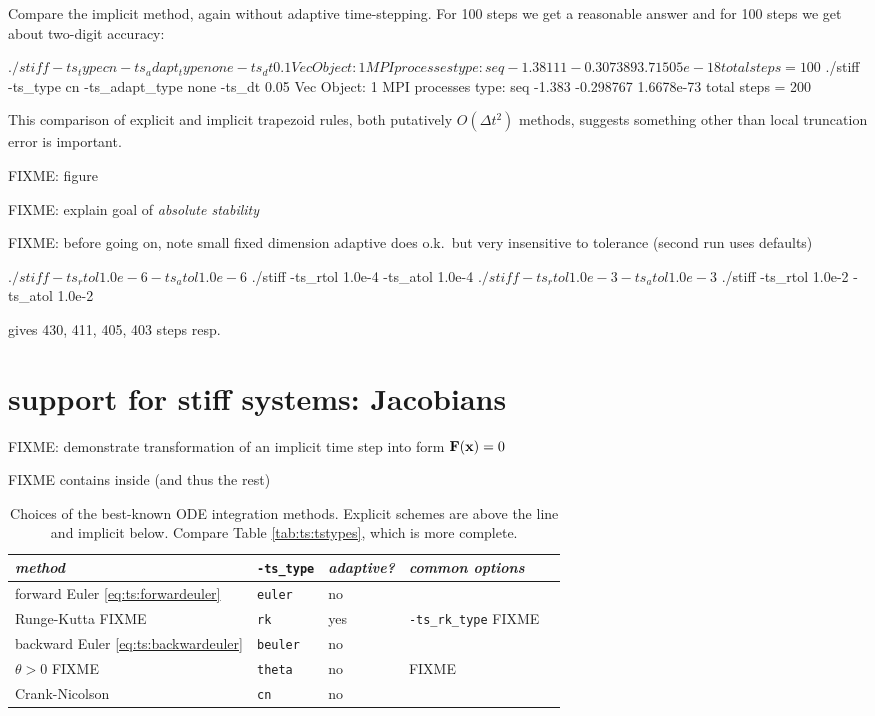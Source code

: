 Compare the implicit method, again without adaptive time-stepping.  For 100 steps we get a reasonable answer and for 100 steps we get about two-digit accuracy:
\begin{cline}
$ ./stiff -ts_type cn -ts_adapt_type none -ts_dt 0.1
Vec Object: 1 MPI processes
  type: seq
-1.38111
-0.307389
3.71505e-18
total steps = 100
$ ./stiff -ts_type cn -ts_adapt_type none -ts_dt 0.05
Vec Object: 1 MPI processes
  type: seq
-1.383
-0.298767
1.6678e-73
total steps = 200
\end{cline}
This comparison of explicit and implicit trapezoid rules, both putatively $O(\Delta t^2)$ methods, suggests something other than local truncation error is important.

FIXME: figure

FIXME: explain goal of \emph{absolute stability}

FIXME: before going on, note small fixed dimension adaptive \RKthreebs does o.k.~but very insensitive to tolerance (second run uses defaults)
\begin{cline}
$ ./stiff -ts_rtol 1.0e-6 -ts_atol 1.0e-6
$ ./stiff -ts_rtol 1.0e-4 -ts_atol 1.0e-4
$ ./stiff -ts_rtol 1.0e-3 -ts_atol 1.0e-3
$ ./stiff -ts_rtol 1.0e-2 -ts_atol 1.0e-2
\end{cline}
gives 430, 411, 405, 403 steps resp.

\section{\pTS support for stiff systems: Jacobians}   FIXME: demonstrate transformation of an implicit time step into form $\mathbf{F}(\mathbf{x})=0$

FIXME \pTS contains \pSNES inside (and thus the rest)

\begin{table}
\small
\begin{tabular}{lllll}
\emph{method}                                & \texttt{-ts\_type} & \emph{adaptive?} & \emph{common options} \\ \hline
forward Euler \eqref{eq:ts:forwardeuler}    & \texttt{euler}  & no & \\
Runge-Kutta  FIXME                          & \texttt{rk}     & yes & \texttt{-ts\_rk\_type} FIXME \\ \hline
backward Euler \eqref{eq:ts:backwardeuler}  & \texttt{beuler} & no & \\
$\theta>0$   FIXME                          & \texttt{theta}  & no & FIXME \\
Crank-Nicolson                              & \texttt{cn}     & no & 
\end{tabular}
\caption{Choices of the best-known ODE integration methods.  Explicit schemes are above the line and implicit below.  Compare Table \ref{tab:ts:tstypes}, which is more complete.} \label{tab:ts:odebasictypes}
\end{table}

